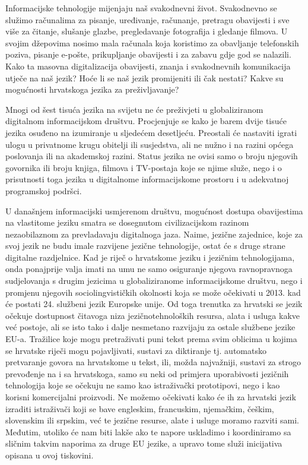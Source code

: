 \begin{multicols}{2}
Informacijske tehnologije mijenjaju naš svakodnevni život. Svakodnevno se služimo računalima za pisanje, uređivanje, računanje, pretragu obavijesti i sve više za čitanje, slušanje glazbe, pregledavanje fotografija i gledanje filmova. U svojim džepovima nosimo mala računala koja koristimo za obavljanje telefonskih poziva, pisanje e-pošte, prikupljanje obavijesti i za zabavu gdje god se nalazili. Kako ta masovna digitalizacija obavijesti, znanja i svakodnevnih komunikacija utječe na naš jezik? Hoće li se naš jezik promijeniti ili čak nestati? Kakve su mogućnosti hrvatskoga jezika za preživljavanje?

Mnogi od šest tisuća jezika na svijetu ne će preživjeti u globaliziranom digitalnom informacijskom društvu. Procjenjuje se kako je barem dvije tisuće jezika osuđeno na izumiranje u sljedećem desetljeću. Preostali će nastaviti igrati ulogu u privatnome krugu obitelji ili susjedstva, ali ne nužno i na razini općega poslovanja ili na akademskoj razini. Status jezika ne ovisi samo o broju njegovih govornika ili broju knjiga, filmova i TV-postaja koje se njime služe, nego i o prisutnosti toga jezika u digitalnome informacijskome prostoru i u adekvatnoj programskoj podršci.

U današnjem informacijski usmjerenom društvu, mogućnost dostupa obavijestima na vlastitome jeziku smatra se dosegnutom civilizacijskom razinom nezaobilaznom za prevladavaju digitalnoga jaza. Naime, jezične zajednice, koje za svoj jezik ne budu imale razvijene jezične tehnologije, ostat će s druge strane digitalne razdjelnice. Kad je riječ o hrvatskome jeziku i jezičnim tehnologijama, onda ponajprije valja imati na umu ne samo osiguranje njegova ravnopravnoga sudjelovanja s drugim jezicima u globaliziranome informacijskome društvu, nego i promjenu njegovih sociolingvističkih okolnosti koja se može očekivati u 2013. kad će postati 24. službeni jezik Europske unije. Od toga trenutka za hrvatski se jezik očekuje dostupnost čitavoga niza jezičnotehnoloških resursa, alata i usluga kakve već postoje, ali se isto tako i dalje nesmetano razvijaju za ostale službene jezike EU-a. Tražilice koje mogu pretraživati puni tekst prema svim oblicima u kojima se hrvatske riječi mogu pojavljivati, sustavi za diktiranje tj. automatsko pretvaranje govora na hrvatskome u tekst, ili, možda najvažniji, sustavi za strogo prevođenje na i sa hrvatskoga, samo su neki od primjera uporabivosti jezičnih tehnologija koje se očekuju ne samo kao istraživački prototipovi, nego i kao korisni komercijalni proizvodi. Ne možemo očekivati kako će ih za hrvatski jezik izraditi istraživači koji se bave engleskim, francuskim, njemačkim, češkim, slovenskim ili srpskim, već te jezične resurse, alate i usluge moramo razviti sami. Međutim, utoliko će nam biti lakše ako te napore uskladimo i koordiniramo sa sličnim takvim naporima za druge EU jezike, a upravo tome služi inicijativa opisana u ovoj tiskovini.


\end{multicols}
